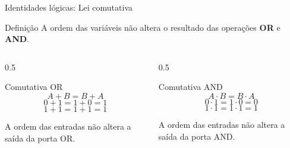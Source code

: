 
\begin{frame}{Identidades lógicas: Lei comutativa}
    \begin{block}{Definição}
        A ordem das variáveis não altera o resultado das operações
        \textbf{OR} e \textbf{AND}.
    \end{block}

    \begin{columns}[T]

        \begin{column}{0.5\textwidth}
            \begin{block}{Comutativa OR}
                \[
                    \boxed{A + B = B + A}
                \]
                \[
                    0 + 1 = 1 + 0 = 1
                \]
                \[
                    1 + 1 = 1 + 1 = 1
                \]

                A ordem das entradas não altera
                a saída da porta OR.
            \end{block}
        \end{column}

        \begin{column}{0.5\textwidth}
            \begin{block}{Comutativa AND}
                \[
                    \boxed{A \cdot B = B \cdot A}
                \]
                \[
                    0 \cdot 1 = 1 \cdot 0 = 0
                \]
                \[
                    1 \cdot 1 = 1 \cdot 1 = 1
                \]

                A ordem das entradas não altera
                a saída da porta AND.
            \end{block}
        \end{column}

    \end{columns}
    
\end{frame}